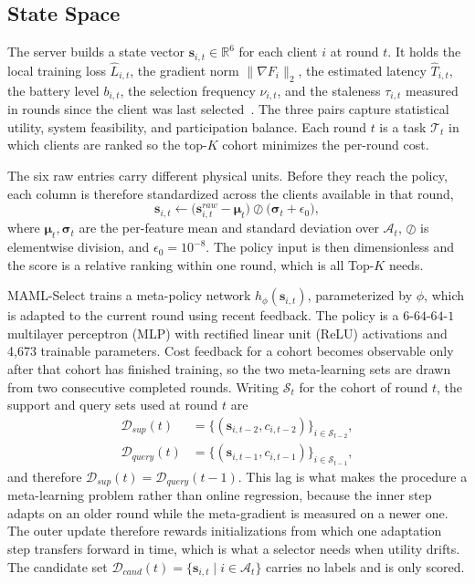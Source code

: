 \documentclass[journal]{IEEEtran}
\theoremstyle{remark}
\newcommand{\revision}[1]{#1}
\newcommand{\revtwo}[1]{#1}
\newcommand{\revtwoeq}{}
\begin{document}
\subsection{State Space}
\revision{The server builds a state vector $\bm{s}_{i,t} \in \mathbb{R}^6$ for each client $i$ at round $t$. It holds the local training loss $\hat{L}_{i,t}$, the gradient norm $\|\nabla F_i\|_2$, the estimated latency $\hat{T}_{i,t}$, the battery level $b_{i,t}$, the selection frequency $\nu_{i,t}$, and the staleness $\tau_{i,t}$ measured in rounds since the client was last selected}~\cite{pan2024contextual,xu2024federated}. The three pairs capture statistical utility, system feasibility, and participation balance. Each round $t$ is a task $\mathcal{T}_t$ in which clients are ranked so the top-$K$ cohort minimizes the per-round cost.

\revtwo{The six raw entries carry different physical units. Before they reach the policy, each column is therefore standardized across the clients available in that round,}
\begin{equation}
	\revtwoeq
	\bm{s}_{i,t} \leftarrow \bigl(\bm{s}^{raw}_{i,t}-\bm{\mu}_t\bigr)\oslash\bigl(\bm{\sigma}_t+\epsilon_0\bigr),
	\label{eq:zscore}
\end{equation}
\revtwo{where $\bm{\mu}_t,\bm{\sigma}_t$ are the per-feature mean and standard deviation over $\mathcal{A}_t$, $\oslash$ is elementwise division, and $\epsilon_0=10^{-8}$. The policy input is then dimensionless and the score is a relative ranking within one round, which is all Top-$K$ needs.}

MAML-Select trains a meta-policy network $h_\phi(\bm{s}_{i,t})$, parameterized by $\phi$, which is adapted to the current round using recent feedback. \revision{The policy is a $6$-$64$-$64$-$1$ multilayer perceptron (MLP) with rectified linear unit (ReLU) activations and 4,673 trainable parameters.} \revtwo{Cost feedback for a cohort becomes observable only after that cohort has finished training, so the two meta-learning sets are drawn from two consecutive completed rounds. Writing $\mathcal{S}_t$ for the cohort of round $t$, the support and query sets used at round $t$ are}
\begin{equation}
	\revtwoeq
	\begin{aligned}
	\mathcal{D}_{sup}(t) &= \bigl\{(\bm{s}_{i,t-2},c_{i,t-2})\bigr\}_{i\in\mathcal{S}_{t-2}}, \\
	\mathcal{D}_{query}(t) &= \bigl\{(\bm{s}_{i,t-1},c_{i,t-1})\bigr\}_{i\in\mathcal{S}_{t-1}} ,
	\end{aligned}
	\label{eq:sets}
\end{equation}
\revtwo{and therefore $\mathcal{D}_{sup}(t)=\mathcal{D}_{query}(t-1)$. This lag is what makes the procedure a meta-learning problem rather than online regression, because the inner step adapts on an older round while the meta-gradient is measured on a newer one. The outer update therefore rewards initializations from which one adaptation step transfers forward in time, which is what a selector needs when utility drifts. The candidate set $\mathcal{D}_{cand}(t)=\{\bm{s}_{i,t}\mid i\in\mathcal{A}_t\}$ carries no labels and is only scored.}
\end{document}
